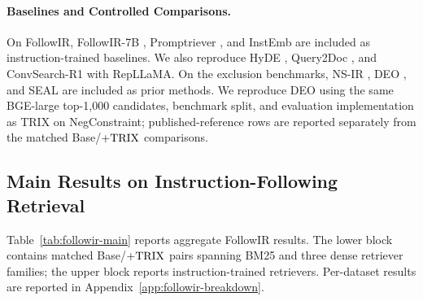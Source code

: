 \documentclass[letterpaper]{article}
\newcommand{\method}{\ifmmode \mathrm{TRIX}\else TRIX\xspace\fi}
\begin{document}
\paragraph{Baselines and Controlled Comparisons.}
On FollowIR, FollowIR-7B \cite{DBLP:conf/naacl/WellerCMLCDLS25},
Promptriever \cite{DBLP:conf/iclr/WellerDLPZH25}, and InstEmb
\cite{gao2026instemb} are included as instruction-trained baselines.
We also reproduce HyDE \cite{DBLP:conf/acl/GaoMLC23}, Query2Doc
\cite{DBLP:conf/emnlp/WangYW23}, and ConvSearch-R1
\cite{DBLP:journals/corr/abs-2503-00223} with RepLLaMA.
On the exclusion benchmarks, NS-IR
\cite{xu2025logical}, DEO
\cite{DBLP:journals/corr/abs-2603-09185}, and SEAL
\cite{DBLP:conf/aaai/ZhangZ0PRRCR25} are included as prior methods.  We
reproduce DEO using the same BGE-large top-1,000 candidates, benchmark split,
and evaluation implementation as \method{} on NegConstraint;
published-reference rows are reported separately from the matched
Base/$+\method$ comparisons.

\subsection{Main Results on Instruction-Following Retrieval}
\label{sec:main-results}

Table~\ref{tab:followir-main} reports aggregate FollowIR results.  The lower
block contains matched Base/$+\method$ pairs spanning BM25 and three dense
retriever families; the upper block reports instruction-trained retrievers.
Per-dataset results are reported in
Appendix~\ref{app:followir-breakdown}.
\end{document}
